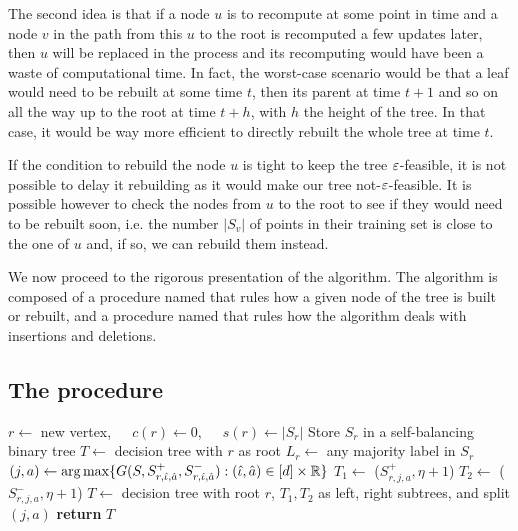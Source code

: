 The second idea is that if a node $u$ is to recompute at some point in time and a node $v$ in the path from this $u$ to the root is recomputed a few updates later, then $u$ will be replaced in the process and its recomputing would have been a waste of computational time. In fact, the worst-case scenario would be that a leaf would need to be rebuilt at some time $t$, then its parent at time $t+1$ and so on all the way up to the root at time $t+h$, with $h$ the height of the tree. In that case, it would be way more efficient to directly rebuilt the whole tree at time $t$.

If the condition to rebuild the node $u$ is tight to keep the tree $\varepsilon$-feasible, it is not possible to delay it rebuilding as it would make our tree not-$\varepsilon$-feasible. It is possible however to check the nodes from $u$ to the root to see if they would need to be rebuilt soon, i.e. the number $|S_v|$ of points in their training set is close to the one of $u$ and, if so, we can rebuild them instead.

We now proceed to the rigorous presentation of the algorithm. The algorithm is composed of a procedure named \AlgoBuild{} that rules how a given node of the tree is built or rebuilt, and a procedure named \AlgoUpdate{} that rules how the algorithm deals with insertions and deletions.

\subsection{The \AlgoBuild{} procedure}


\begin{algorithm}
\caption{\algo{}.\AlgoBuild{}} \label{alg:fudy_build}
\begin{algorithmic}[1]
\State $r \gets$ new vertex,~~~$c(r) \gets 0$,~~~$s(r) \gets |S_r|$ %
 \label{alg_line:fudy_build__if_is_leaf}
\State Store $S_r$ in a self-balancing binary tree\label{alg_line:fudy_build__store_data}
\State $T \gets$ decision tree with $r$ as root
\State $L_r \gets $ any majority label in $S_r$
\Else
\State $(j,a) \gets \arg \max \{G(S,S^+_{r,\hat \iota, \hat a}, S^-_{r,\hat \iota, \hat a}) : (\hat \iota, \hat a) \in [d] \times \mathbb{R}\}$\label{alg_line:fudy_build__choose_criterion}
\State $T_1 \gets $ \AlgoBuild{}($S^+_{r,j,a}, \eta + 1$)\label{alg_line:fudy_build__left_child}
\State $T_2 \gets $ \AlgoBuild{}($S^-_{r,j,a}, \eta + 1$)\label{alg_line:fudy_build__right_child}
\State $T \gets$ decision tree with root $r$, $T_1,T_2$ as left, right subtrees, and split $(j,a)$
\EndIf
\State \textbf{return} $T$
\EndProcedure
\end{algorithmic}
\end{algorithm}

